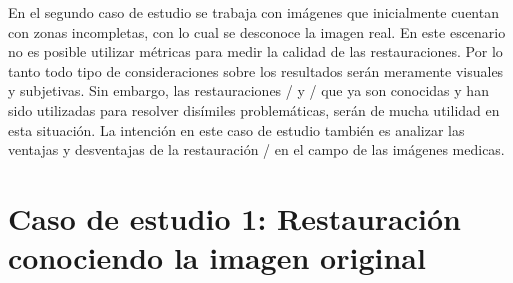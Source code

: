 En el segundo caso de estudio se trabaja con im\'agenes que inicialmente cuentan con zonas incompletas, con lo cual se desconoce la imagen real. En este escenario no es posible utilizar m\'etricas para medir la calidad de las restauraciones. Por lo tanto todo tipo de consideraciones sobre los resultados ser\'an meramente visuales y subjetivas. Sin embargo, las restauraciones \TELEA/ y \NS/ que ya son conocidas y han sido utilizadas para resolver dis\'imiles problem\'aticas, ser\'an de mucha utilidad en esta situaci\'on. La intenci\'on en este caso de estudio tambi\'en es analizar las ventajas y desventajas de la restauraci\'on \SOP/ en el campo de las  im\'agenes medicas.

\section{Caso de estudio 1: Restauraci\'on conociendo la imagen original}

